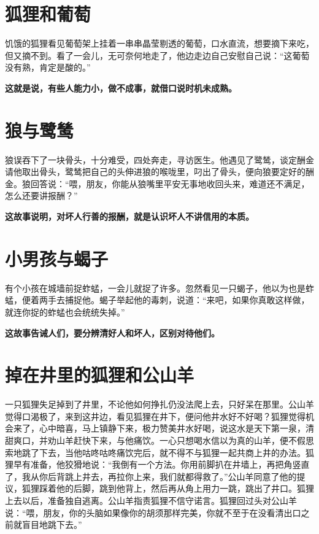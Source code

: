 \section{狐狸和葡萄}

饥饿的狐狸看见葡萄架上挂着一串串晶莹剔透的葡萄，口水直流，想要摘下来吃，但又摘不到。看了一会儿，无可奈何地走了，他边走边自己安慰自己说：“这葡萄没有熟，肯定是酸的。”

{\bfseries \color{red}这就是说，有些人能力小，做不成事，就借口说时机未成熟。}

\section{狼与鹭鸶}

狼误吞下了一块骨头，十分难受，四处奔走，寻访医生。他遇见了鹭鸶，谈定酬金请他取出骨头，鹭鸶把自己的头伸进狼的喉咙里，叼出了骨头，便向狼要定好的酬金。狼回答说：“喂，朋友，你能从狼嘴里平安无事地收回头来，难道还不满足，怎么还要讲报酬？”

{\bfseries \color{red}这故事说明，对坏人行善的报酬，就是认识坏人不讲信用的本质。}

\section{小男孩与蝎子}

有个小孩在城墙前捉蚱蜢，一会儿就捉了许多。忽然看见一只蝎子，他以为也是蚱蜢，便着两手去捕捉他。蝎子举起他的毒刺，说道：“来吧，如果你真敢这样做，就连你捉的蚱蜢也会统统失掉。”

{\bfseries \color{red}这故事告诫人们，要分辨清好人和坏人，区别对待他们。}

\section{掉在井里的狐狸和公山羊}

一只狐狸失足掉到了井里，不论他如何挣扎仍没法爬上去，只好呆在那里。公山羊觉得口渴极了，来到这井边，看见狐狸在井下，便问他井水好不好喝？狐狸觉得机会来了，心中暗喜，马上镇静下来，极力赞美井水好喝，说这水是天下第一泉，清甜爽口，并劝山羊赶快下来，与他痛饮。一心只想喝水信以为真的山羊，便不假思索地跳了下去，当他咕咚咕咚痛饮完后，就不得不与狐狸一起共商上井的办法。狐狸早有准备，他狡猾地说：“我倒有一个方法。你用前脚扒在井墙上，再把角竖直了，我从你后背跳上井去，再拉你上来，我们就都得救了。”公山羊同意了他的提议，狐狸踩着他的后脚，跳到他背上，然后再从角上用力一跳，跳出了井口。狐狸上去以后，准备独自逃离。公山羊指责狐狸不信守诺言。狐狸回过头对公山羊说：“喂，朋友，你的头脑如果像你的胡须那样完美，你就不至于在没看清出口之前就盲目地跳下去。”

